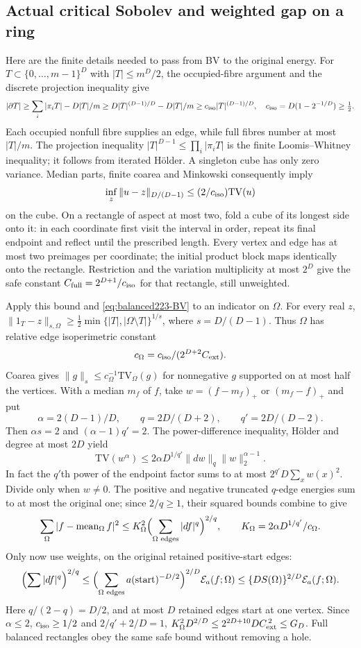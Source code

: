 \subsection{Actual critical Sobolev and weighted gap on a ring}
Here are the finite details needed to pass from BV to the original energy.
For $T\subset\{0,\ldots,m-1\}^D$ with $|T|\le m^D/2$, the occupied-fibre
argument and the discrete projection inequality give
\[
 |\partial T|\ge\sum_i|\pi_iT|-D|T|/m
 \ge D|T|^{(D-1)/D}-D|T|/m
 \ge c_{\rm iso}|T|^{(D-1)/D},\quad
 c_{\rm iso}=D(1-2^{-1/D})\ge\tfrac12.
\]
Each occupied nonfull fibre supplies an edge, while full fibres number at
most $|T|/m$. The projection inequality
$|T|^{D-1}\le\prod_i|\pi_iT|$ is the finite Loomis--Whitney inequality;
it follows from iterated H\"older. A singleton cube has only zero variance.
Median parts, finite coarea and Minkowski consequently imply
\[
 \inf_z\|u-z\|_{D/(D-1)}\le(2/c_{\rm iso})\mathrm{TV}(u)
\]
on the cube. On a rectangle of aspect at most two, fold a cube of its
longest side onto it: in each coordinate first visit the interval in
order, repeat its final endpoint and reflect until the prescribed length.
Every vertex and edge has at most two preimages per coordinate; the
initial product block maps identically onto the rectangle. Restriction
and the variation multiplicity at most $2^D$ give the safe constant
$C_{\rm full}=2^{D+1}/c_{\rm iso}$ for that rectangle, still unweighted.

Apply this bound and \eqref{eq:balanced223-BV} to an indicator on $\Omega$.
For every real $z$,
$\|1_T-z\|_{s,\Omega}\ge\frac12\min\{|T|,|\Omega\setminus T|\}^{1/s}$,
where $s=D/(D-1)$. Thus $\Omega$ has relative edge isoperimetric constant
\[
 c_\Omega=c_{\rm iso}/(2^{D+2}C_{\rm ext}).
\]
Coarea gives $\|g\|_s\le c_\Omega^{-1}\mathrm{TV}_\Omega(g)$ for
nonnegative $g$ supported on at most half the vertices. With a median $m_f$
of $f$, take $w=(f-m_f)_+$ or $(m_f-f)_+$ and put
\[
 \alpha=2(D-1)/D,\qquad q=2D/(D+2),\qquad q'=2D/(D-2).
\]
Then $\alpha s=2$ and $(\alpha-1)q'=2$. The power-difference inequality,
H\"older and degree at most $2D$ yield
\[
 \mathrm{TV}(w^\alpha)
 \le2\alpha D^{1/q'}\|dw\|_q\|w\|_2^{\alpha-1}.
\]
In fact the $q'$th power of the endpoint factor sums to at most
$2^{q'}D\sum_xw(x)^2$. Divide only when $w\ne0$. The positive and
negative truncated $q$-edge energies sum to at most the original one;
since $2/q\ge1$, their squared bounds combine to give
\begin{equation}\label{eq:balanced223-q}
 \sum_\Omega|f-\operatorname{mean}_\Omega f|^2
 \le K_\Omega^2\Bigl(\sum_{\Omega\text{ edges}}|df|^q\Bigr)^{2/q},
 \qquad K_\Omega=2\alpha D^{1/q'}/c_\Omega.
\end{equation}
Only now use weights, on the original retained positive-start edges:
\[
 \Bigl(\sum |df|^q\Bigr)^{2/q}
 \le\Bigl(\sum_{\Omega\text{ edges}}a(\mathrm{start})^{-D/2}\Bigr)^{2/D}
       \mathcal E_a(f;\Omega)
 \le\{DS(\Omega)\}^{2/D}\mathcal E_a(f;\Omega).
\]
Here $q/(2-q)=D/2$, and at most $D$ retained edges start at one vertex.
Since $\alpha\le2$, $c_{\rm iso}\ge1/2$ and $2/q'+2/D=1$,
$K_\Omega^2D^{2/D}\le2^{2D+10}DC_{\rm ext}^{\,2}\le G_D$.
Full balanced rectangles obey the same safe bound without removing a hole.


